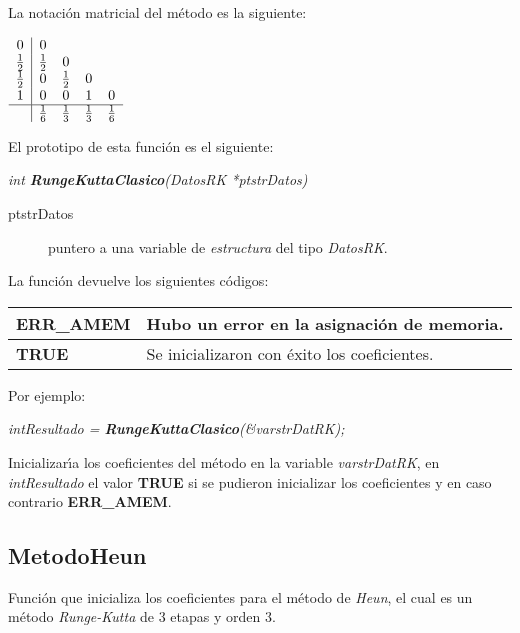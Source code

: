 La notaci\'on matricial del m\'etodo es la siguiente:

\begin{center}
$
\begin{array}{c|cccc}
0 & 0 \\
\frac{1}{2} & \frac{1}{2} & 0 \\
\frac{1}{2} & 0 & \frac{1}{2} & 0 \\
1 & 0 & 0 & 1 & 0 \\
\hline
 & \frac{1}{6} & \frac{1}{3} & \frac{1}{3} & \frac{1}{6} \\
\end{array}
$
\end{center}

El prototipo de esta funci\'on es el siguiente:

\begin{center}
\emph{int \textbf{RungeKuttaClasico}(DatosRK *ptstrDatos)}
\end{center}

\begin{description}
\item[ptstrDatos] puntero a una variable de \emph{estructura} del tipo
\emph{DatosRK}.
\end{description}

La funci\'on devuelve los siguientes c\'odigos:

\begin{center}
\begin{tabular}{|l|l|}
\hline
\textbf{ERR\_AMEM} & Hubo un error en la asignaci\'on de memoria. \\
\hline
\textbf{TRUE} & Se inicializaron con \'exito los coeficientes. \\
\hline
\end{tabular}
\end{center}

Por ejemplo:

\begin{center}
\emph{intResultado = \textbf{RungeKuttaClasico}(\&varstrDatRK);}
\end{center}

Inicializar\'{\i}a los coeficientes del m\'etodo en la variable 
\emph{varstrDatRK}, en \emph{intResultado} el valor \textbf{TRUE} si se pudieron
inicializar los coeficientes y en caso contrario \textbf{ERR\_AMEM}.

\newpage

\subsection{MetodoHeun}
Funci\'on que inicializa los coeficientes para el m\'etodo de \emph{Heun}, el
cual es un m\'etodo \emph{Runge-Kutta} de $3$ etapas y orden $3$.\newline

